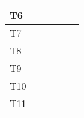 \documentclass[12pt, titlepage]{article}
\begin{document}
\begin{longtable}[c]{|l|lll|l|l|}
    T6                                                 & \multicolumn{1}{c|}{}                                     & \multicolumn{1}{l|}{}                        &                       &          &                                                         \\ \hline
    T7                                                 & \multicolumn{1}{c|}{}                                     & \multicolumn{1}{l|}{}                        &                       &          &                                                         \\ \hline
    T8                                                 & \multicolumn{1}{c|}{}                                     & \multicolumn{1}{l|}{}                        &                       &          &                                                         \\ \hline
    T9                                                 & \multicolumn{1}{c|}{}                                     & \multicolumn{1}{l|}{}                        &                       &          &                                                         \\ \hline
    T10                                                & \multicolumn{1}{c|}{}                                     & \multicolumn{1}{l|}{}                        &                       &          &                                                         \\ \hline
    T11                                                & \multicolumn{1}{c|}{}                                     & \multicolumn{1}{l|}{}                        &                       &          &                                                         \\ \hline
\end{longtable}
\end{document}
